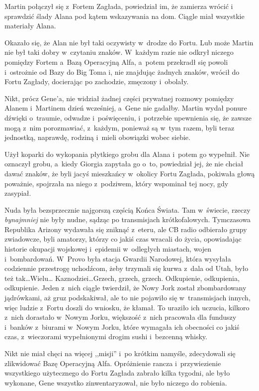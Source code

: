 \documentclass[oneside,polish,11pt,sfheadings]{mwbk}
\begin{document}
Martin połączył się z~Fortem Zagłada, powiedział im, że zamierza wrócić
i sprawdzić ślady Alana pod kątem wskazywania na dom. Ciągle miał
wszystkie materiały Alana.

Okazało się, że Alan nie był taki oczywisty w~drodze do Fortu. Lub może
Martin nie był taki dobry w~czytaniu znaków. W~każdym razie nie odkrył
niczego pomiędzy Fortem a~Bazą Operacyjną Alfa, a~potem przekradł się
powoli i~ostrożnie od Bazy do Big Toma i, nie znajdując żadnych znaków,
wrócił do Fortu Zagłady, docierając po zachodzie, zmęczony i~obolały.

Nikt, prócz Gene'a, nie widział żadnej części prywatnej rozmowy pomiędzy
Alanem i~Martinem dzień wcześniej, a~Gene nie gadałby. Martin wydał
ponure dźwięki o~traumie, odwadze i~poświęceniu, i~potrzebie upewnienia
się, że zawsze mogą z~nim porozmawiać, z~każdym, ponieważ są w~tym
razem, byli teraz jednostką, naprawdę, rodziną i~mieli obowiązki wobec
siebie.

Użył koparki do wykopania płytkiego grobu dla Alana i~potem go wypełnił.
Nie oznaczył grobu, a~kiedy Giorgia zapytała go o~to, powiedział jej, że
nie chciał dawać znaków, że byli jacyś mieszkańcy w~okolicy Fortu
Zagłada, pokiwała głową poważnie, spojrzała na niego z~podziwem, który
wspominał tej nocy, gdy zasypiał.

Nuda była bezsprzecznie najgorszą częścią Końca Świata. Tam w~świecie,
rzeczy \textit{bynajmniej} nie były nudne, sądząc po transmisjach
krótkofalowych. Tymczasowa Republika Arizony wydawała się zniknąć z~eteru, ale CB radio odbierało grupy zwiadowcze, byli amatorzy, którzy co
jakiś czas wracali do życia, opowiadając historie okupacji wojskowej i~epidemii w~odległych miastach, wojen i~bombardowań. W~Provo była stacja
Gwardii Narodowej, która wysyłała codziennie przestrogę uchodźcom, żeby
trzymali się kurwa z~dala od Utah, było też tak\ldots  Wielu\ldots 
Kaznodziei\ldots  Grzech, grzech, grzech. Odkupienie, odkupienia,
odkupienie. Jeden z~nich ciągle twierdził, że Nowy Jork został
zbombardowany jądrówkami, aż gruz podskakiwał, ale to nie pojawiło się w~transmisjach innych, więc ludzie z~Fortu doszli do wniosku, że kłamał.
To uraziło ich uczucia, kilkoro z~nich dorastało w~Nowym Jorku,
większość z~nich pracowała dla funduszy i~banków z~biurami w~Nowym
Jorku, które wymagała ich obecności co jakiś czas, z~wieczorami
wypełnionymi drogim sushi i~bezcenną whisky.

Nikt nie miał chęci na więcej ,,misji'' i~po krótkim namyśle,
zdecydowali się zlikwidować Bazę Operacyjną Alfa. Opróżnienie rancza i~przywiezienie wszystkiego użytecznego do Fortu Zagłada zabrało kilka
tygodni, ale było wykonane, Gene wszystko zinwentaryzował, nie było
niczego do robienia.
\end{document}
